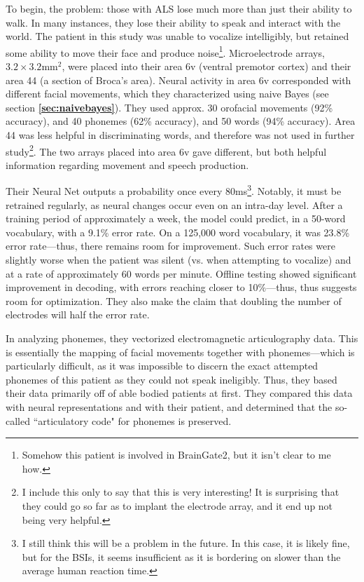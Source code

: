 To begin, the problem: those with ALS lose much more than just their ability to walk. In many instances, they lose their ability to speak and interact with the world. The patient in this study was unable to vocalize intelligibly, but retained some ability to move their face and produce noise\footnote{Somehow this patient is involved in BrainGate2, but it isn't clear to me how.}. Microelectrode arrays, $3.2 \times 3.2 \mathrm{mm}^2$, were placed into their area 6v (ventral premotor cortex) and their area 44 (a section of Broca's area). Neural activity in area 6v corresponded with different facial movements, which they characterized using naive Bayes (see section \textbf{\ref{sec:naivebayes}}). They used approx. 30 orofacial movements (92\% accuracy), and 40 phonemes (62\% accuracy), and 50 words (94\% accuracy). Area 44 was less helpful in discriminating words, and therefore was not used in further study\footnote{I include this only to say that this is very interesting! It is surprising that they could go so far as to implant the electrode array, and it end up not being very helpful.}. The two arrays placed into area 6v gave different, but both helpful information regarding movement and speech production.\newline

Their Neural Net outputs a probability once every 80ms\footnote{I still think this will be a problem in the future. In this case, it is likely fine, but for the BSIs, it seems insufficient as it is bordering on slower than the average human reaction time.}. Notably, it must be retrained regularly, as neural changes occur even on an intra-day level. After a training period of approximately a week, the model could predict, in a 50-word vocabulary, with a 9.1\% error rate. On a 125,000 word vocabulary, it was 23.8\% error rate---thus, there remains room for improvement. Such error rates were slightly worse when the patient was silent (vs. when attempting to vocalize) and at a rate of approximately 60 words per minute. Offline testing showed significant improvement in decoding, with errors reaching closer to 10\%---thus, thus suggests room for optimization. They also make the claim that doubling the number of electrodes will half the error rate. \newline

In analyzing phonemes, they vectorized electromagnetic articulography data. This is essentially the mapping of facial movements together with phonemes---which is particularly difficult, as it was impossible to discern the exact attempted phonemes of this patient as they could not speak ineligibly. Thus, they based their data primarily off of able bodied patients at first. They compared this data with neural representations and with their patient, and determined that the so-called ``articulatory code" for phonemes is preserved. 

